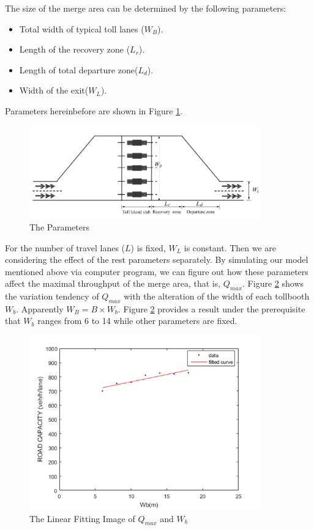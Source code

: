 \documentclass{mcmthesis}
\begin{document}
The size of the merge area can be determined by
the following parameters:
\begin{itemize}
\item Total width of typical toll lanes ($W_{B}$).
\item Length of the recovery zone ($L_{r}$).
\item Length of total departure zone($L_{d}$).
\item Width of the exit($W_{L}$).
\end{itemize}
Parameters hereinbefore are shown in Figure \ref{fig4}.
\begin{figure}[h]
\small
\centering
\includegraphics[width=10cm]{figure4}
\caption{The Parameters}\label{fig4}
\end{figure}
For the number of travel lanes ($L$) is fixed, $W_{L}$ is
constant. Then we are considering the effect of the
rest parameters separately. By simulating our model
mentioned above via computer program, we can figure
out how these parameters affect the maximal throughput
of the merge area, that is, $Q_{max}$.
Figure \ref{fig5} shows the variation tendency of
$Q_{max}$ with
the alteration of the width of each tollbooth $W_{b}$.
Apparently $W_{B} = B \times W_{b}$. Figure \ref{fig5}
provides a result
under the prerequisite that $W_b$ ranges from 6 to 14
while other parameters are fixed.
\begin{figure}[h]
\small
\centering
\includegraphics[width=10cm]{figure5}
\caption{The Linear Fitting Image of $Q_{max}$ and $W_b$}\label{fig5}
\end{figure}
\end{document}
